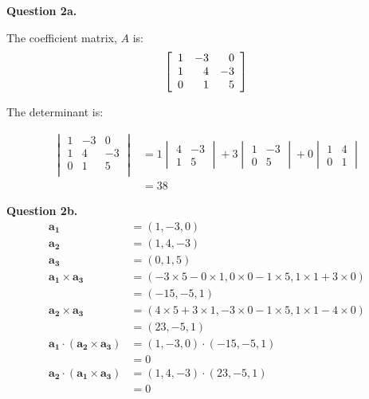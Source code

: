 \documentclass[12pt,a4paper]{report}
\begin{document}
\textbf{Question 2a.}

The coefficient matrix, \( A \) is:
\[
 \left[\begin{array}{rrr}
   1 & -3 &  0 \\
   1 &  4 & -3 \\
   0 &  1 &  5 \\
   \end{array} \right] \\
\]

The determinant is:

\begin{align*}
\begin{vmatrix}
   1 & -3 &  0 \\
   1 &  4 & -3 \\
   0 &  1 &  5 \\
\end{vmatrix} &= 1 \begin{vmatrix} 4 & -3 \\
 1 & 5 \end{vmatrix} + 3 \begin{vmatrix} 1 & -3 \\ 
0 & 5 
\end{vmatrix} + 0 \begin{vmatrix} 1 & 4 \\ 
0 & 1 \end{vmatrix}\\
&= 38
\end{align*}

\textbf{Question 2b.}
\begin{align*}
\mathbf{a_1} &= (1, -3, 0) \\
\mathbf{a_2} &= (1, 4, -3) \\
\mathbf{a_3} &= (0, 1, 5) \\
\mathbf{a_1} \times \mathbf{a_3} &= (-3 \times 5 - 0 \times 1, 0 \times 0 - 1 \times 5, 1 \times 1 + 3 \times 0) \\
                                 &= (-15, -5, 1) \\
\mathbf{a_2} \times \mathbf{a_3} &= (4 \times 5 + 3 \times 1, -3 \times 0 - 1 \times 5, 1 \times 1 - 4 \times 0) \\
                                 &= (23, -5, 1) \\
\mathbf{a_1} \cdot (\mathbf{a_2} \times \mathbf{a_3}) &= (1, -3, 0) \cdot (-15, -5, 1) \\
                                                      &= 0 \\
\mathbf{a_2} \cdot (\mathbf{a_1} \times \mathbf{a_3}) &= (1, 4, -3) \cdot (23, -5, 1) \\
                                                      &= 0 \\
\end{align*}
\end{document}
